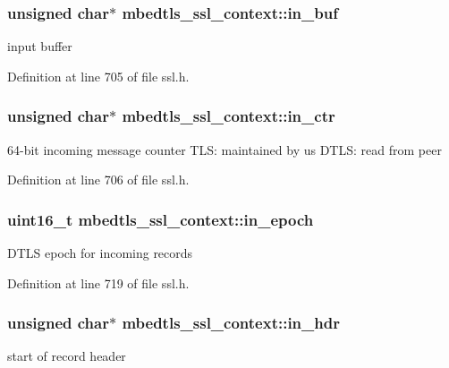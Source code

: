 \hypertarget{structmbedtls__ssl__context_a81a9c513f47631c198d74cbeb4d1999f}{
\subsubsection[{in\-\_\-buf}]{\setlength{\rightskip}{0pt plus 5cm}unsigned char$\ast$ mbedtls\-\_\-ssl\-\_\-context\-::in\-\_\-buf}}\label{structmbedtls__ssl__context_a81a9c513f47631c198d74cbeb4d1999f}
input buffer 

Definition at line 705 of file ssl.\-h.

\hypertarget{structmbedtls__ssl__context_ab53517e77417e69419985902a528cc6a}{
\subsubsection[{in\-\_\-ctr}]{\setlength{\rightskip}{0pt plus 5cm}unsigned char$\ast$ mbedtls\-\_\-ssl\-\_\-context\-::in\-\_\-ctr}}\label{structmbedtls__ssl__context_ab53517e77417e69419985902a528cc6a}
64-\/bit incoming message counter T\-L\-S\-: maintained by us D\-T\-L\-S\-: read from peer 

Definition at line 706 of file ssl.\-h.

\hypertarget{structmbedtls__ssl__context_ae6d4405b5829fb244a0d6a4ad1e20d91}{
\subsubsection[{in\-\_\-epoch}]{\setlength{\rightskip}{0pt plus 5cm}uint16\-\_\-t mbedtls\-\_\-ssl\-\_\-context\-::in\-\_\-epoch}}\label{structmbedtls__ssl__context_ae6d4405b5829fb244a0d6a4ad1e20d91}
D\-T\-L\-S epoch for incoming records 

Definition at line 719 of file ssl.\-h.

\hypertarget{structmbedtls__ssl__context_ac1d0542cf430db2fb4b2855afc29fd5e}{
\subsubsection[{in\-\_\-hdr}]{\setlength{\rightskip}{0pt plus 5cm}unsigned char$\ast$ mbedtls\-\_\-ssl\-\_\-context\-::in\-\_\-hdr}}\label{structmbedtls__ssl__context_ac1d0542cf430db2fb4b2855afc29fd5e}
start of record header 

